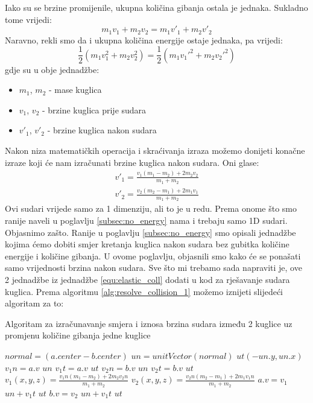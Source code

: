 Iako su se brzine promijenile, ukupna količina gibanja ostala je jednaka. Sukladno tome vrijedi:
\begin{equation}\label{equ:kol_gib}
	m_{1}  v_{1} + m_{2} v_{2} = m_{1}  v'_{1} + m_{2}  v'_{2}
\end{equation}
Naravno, rekli smo da i ukupna količina energije ostaje jednaka, pa vrijedi:
\begin{equation}\label{equ:kol_energ}
\frac{1}{2}  (m_{1}  v_{1}^2 + m_{2}  v_{2}^2) = \frac{1}{2}  (m_{1}  v_{1}'^2 + m_{2}  v_{2}'^2)
\end{equation}
gdje su u obje jednadžbe:
\begin{itemize}
	\item $m_{1}$, $m_{2}$ - mase kuglica
	\item $v_{1}$, $v_{2}$ - brzine kuglica prije sudara
	\item $v'_{1}$, $v'_{2}$ - brzine kuglica nakon sudara
\end{itemize}
Nakon niza matematičkih operacija i skraćivanja izraza možemo donijeti konačne izraze koji će nam izračunati brzine kuglica nakon sudara. Oni glase\cite{13}:
\begin{equation}\label{equ:elastic_coll}
	\begin{aligned}
		v'_{1} = \frac{v_{1}  (m_{1} - m_{2}) + 2  m_{2} v_{2}}{m_{1} + m_{2}}\\
		v'_{2} = \frac{v_{2}  (m_{2} - m_{1}) + 2  m_{1} v_{1}}{m_{1} + m_{2}}
	\end{aligned}
\end{equation}
Ovi sudari vrijede samo za 1 dimenziju, ali to je u redu\cite{13}. Prema onome što smo ranije naveli u poglavlju \ref{subsec:no_energy} nama i trebaju samo 1D sudari. Objasnimo zašto. Ranije u poglavlju \ref{subsec:no_energy} smo opisali jednadžbe kojima ćemo dobiti smjer kretanja kuglica nakon sudara bez gubitka količine energije i količine gibanja. U ovome poglavlju, objasnili smo kako će se ponašati samo vrijednosti brzina nakon sudara. Sve što mi trebamo sada napraviti je, ove 2 jednadžbe iz jednadžbe \ref{equ:elastic_coll} dodati u kod za rješavanje sudara kuglica. Prema algoritmu \ref{alg:resolve_collision_1} možemo iznijeti slijedeći algoritam za to:\newline
\begin{algorithm}
	\caption{Algoritam za izračunavanje smjera i iznosa brzina sudara između 2 kuglice uz promjenu količine gibanja jedne kuglice}
	\label{alg:resolve_collision_2}
	\begin{algorithmic}
		\Return
		\EndIf
		\State $normal = (a.center - b.center)$
		\State $un = unitVector(normal)$
		\State $ut(-un.y,un.x)$
		\State $v_{1}n = a.v$ $un$
		\State $v_{1}t = a.v$  $ut$
		\State $v_{2}n = b.v$  $un$
		\State $v_{2}t = b.v$  $ut$
		\State $v_{1}(x,y,z) = \frac{v_{1}n  (m_{1} - m_{2}) + 2  m_{2} v_{2}n}{m_{1} + m_{2}}$
		\State $v_{2}(x,y,z) = \frac{v_{2}n  (m_{2} - m_{1}) + 2  m_{1} v_{1}n}{m_{1} + m_{2}}$
		\State $a.v = v_{1}$  $un + v_{1}t$  $ut$
		\State $b.v = v_{2}$  $un + v_{1}t$  $ut$
		\EndFunction
	\end{algorithmic}
\end{algorithm}\

